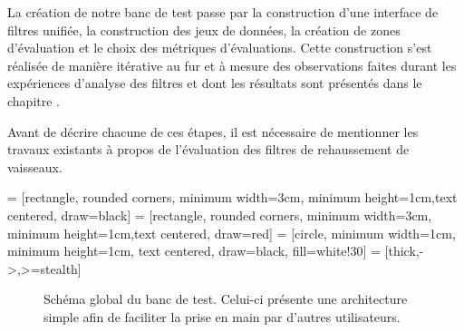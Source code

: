 La création de notre banc de test passe par la construction d'une interface de filtres unifiée, la construction des jeux de données, la création de zones d'évaluation et le choix des métriques d'évaluations. Cette construction s'est réalisée de manière itérative au fur et à mesure des observations faites durant les expériences d'analyse des filtres et dont les résultats sont présentés dans le chapitre \chapAnalysisN{}.

Avant de décrire chacune de ces étapes, il est nécessaire de mentionner les travaux existants à propos de l'évaluation des filtres de rehaussement de vaisseaux.

 = [rectangle, rounded corners, minimum width=3cm, minimum height=1cm,text centered, draw=black]
 = [rectangle, rounded corners, minimum width=3cm, minimum height=1cm,text centered, draw=red]
 = [circle, minimum width=1cm, minimum height=1cm, text centered, draw=black, fill=white!30]
 = [thick,->,>=stealth]

\begin{figure}[!ht]
  \centering
  \caption{Schéma global du banc de test. Celui-ci présente une architecture simple afin de faciliter la prise en main par d'autres utilisateurs.}
  \label{fig:schéma banc de test}
\end{figure}

